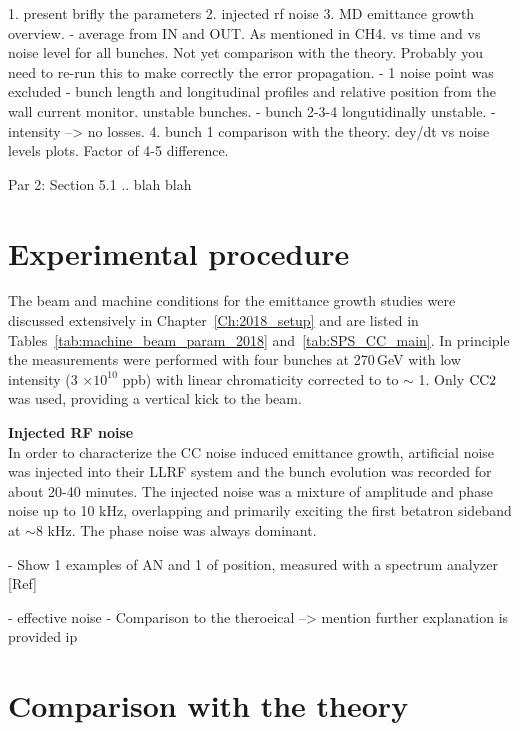 \vspace*{-1mm}

1. present brifly the parameters
2. injected rf noise
3. MD emittance growth overview. 
    - average from IN and OUT. As mentioned in CH4. vs time and vs noise level for all bunches. Not yet comparison with the theory. Probably you need to re-run this to make correctly the error propagation. 
    - 1 noise point was excluded
    - bunch length and longitudinal profiles and relative position from the wall current monitor.  unstable bunches.
    - bunch 2-3-4 longutidinally unstable.
    - intensity --> no losses.
4. bunch 1 comparison with the theory. dey/dt vs noise levels plots. Factor of 4-5 difference. 

Par 2: Section 5.1 .. blah blah

\section{Experimental procedure}
\begin{sloppypar} %
The beam and machine conditions for the emittance growth studies were discussed extensively in Chapter~\ref{Ch:2018_setup} and are listed in Tables~\ref{tab:machine_beam_param_2018} and~\ref{tab:SPS_CC_main}. In principle the measurements were performed with four bunches at 270\,GeV with low intensity (3 $\times \mathrm{10^{10}}$ ppb) with linear chromaticity corrected to to $\sim$ 1. Only ${\mathrm{CC}}2$ was used, providing a vertical kick to the beam.
\end{sloppypar} %


\normalsize{\textbf{Injected RF noise}}\\
 In order to characterize the CC noise induced emittance growth, artificial noise was injected into their LLRF system and the bunch evolution was recorded for about 20-40 minutes. The injected noise was a mixture of amplitude and phase noise up to 10 kHz, overlapping and primarily exciting the first betatron sideband at $\sim 8$ kHz. The phase noise was always dominant. 
 
 - Show 1 examples of AN and 1 of position, measured with a spectrum analyzer [Ref]

 - effective noise
 - Comparison to the theroeical --> mention further explanation is provided ip 

 \section{Comparison with the theory}\label{sec:MD2018_vs_theory}